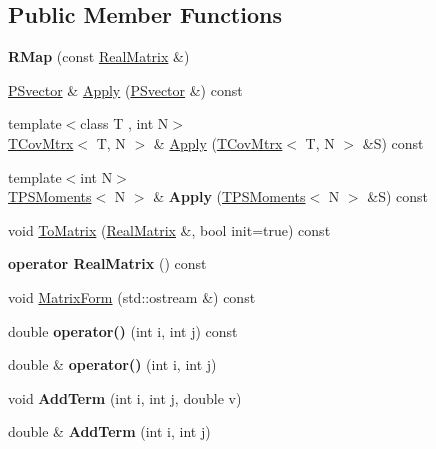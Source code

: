 \subsection*{Public Member Functions}
\begin{DoxyCompactItemize}
\item 
\mbox{\label{classRMap_aacff921afa4b47cdfd7a89dc958fbbe1}} 
{\bfseries R\+Map} (const \hyperlink{classTLAS_1_1Matrix}{Real\+Matrix} \&)
\item 
\hyperlink{classPSvector}{P\+Svector} \& \hyperlink{classRMap_a5f066ccc0acd249f83e9f5a8745e247e}{Apply} (\hyperlink{classPSvector}{P\+Svector} \&) const
\item 
{\footnotesize template$<$class T , int N$>$ }\\\hyperlink{classTCovMtrx}{T\+Cov\+Mtrx}$<$ T, N $>$ \& \hyperlink{classRMap_a1fae020085d62fe0ca1619f0e7d04329}{Apply} (\hyperlink{classTCovMtrx}{T\+Cov\+Mtrx}$<$ T, N $>$ \&S) const
\item 
\mbox{\label{classRMap_a0d3f81dfaa8febb00bb033750980ac33}} 
{\footnotesize template$<$int N$>$ }\\\hyperlink{classTPSMoments}{T\+P\+S\+Moments}$<$ N $>$ \& {\bfseries Apply} (\hyperlink{classTPSMoments}{T\+P\+S\+Moments}$<$ N $>$ \&S) const
\item 
void \hyperlink{classRMap_ac9ee823c65ecb03557cb2eb77aaf5b2a}{To\+Matrix} (\hyperlink{classTLAS_1_1Matrix}{Real\+Matrix} \&, bool init=true) const
\item 
\mbox{\label{classRMap_adea1a38748338d0fc6c3dd696dd1eba5}} 
{\bfseries operator Real\+Matrix} () const
\item 
void \hyperlink{classRMap_a61aa381d19f03125b9e89b3842f52f1d}{Matrix\+Form} (std\+::ostream \&) const
\item 
\mbox{\label{classRMap_a13cb8a56020de203419518ce2e8c1145}} 
double {\bfseries operator()} (int i, int j) const
\item 
\mbox{\label{classRMap_ac5fa5d827e3cbb65dab1c0b88d21c9af}} 
double \& {\bfseries operator()} (int i, int j)
\item 
\mbox{\label{classRMap_a7219e61d98665c469e03bc36de9f95a8}} 
void {\bfseries Add\+Term} (int i, int j, double v)
\item 
\mbox{\label{classRMap_a0ad9c3f30ba3bf31404ebc8af27abe9c}} 
double \& {\bfseries Add\+Term} (int i, int j)
\end{DoxyCompactItemize}
